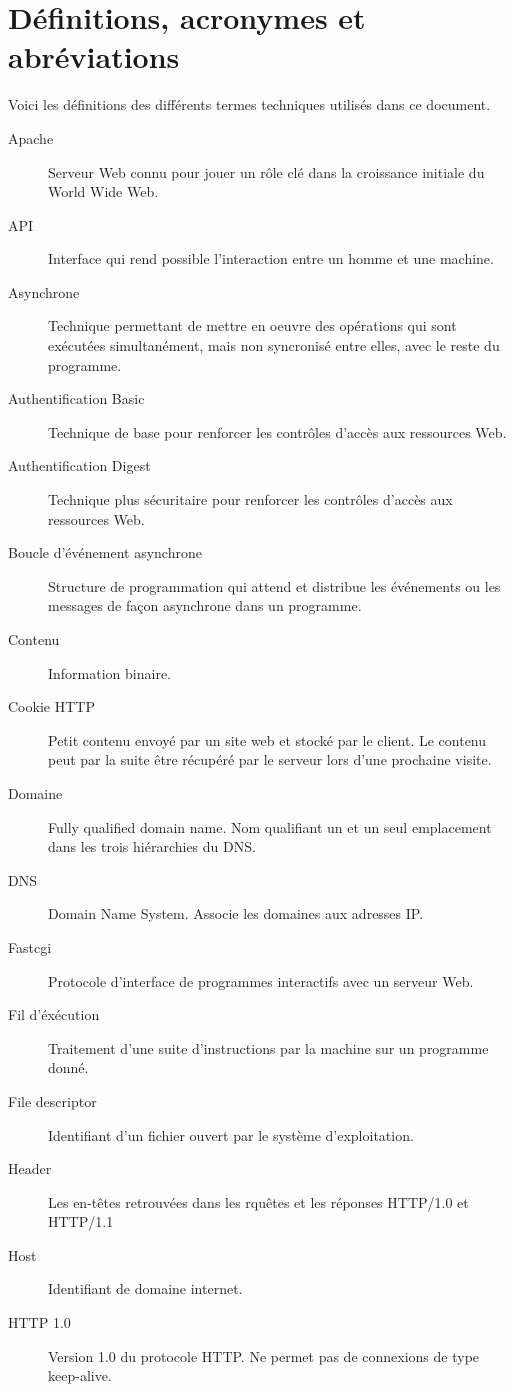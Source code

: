 \documentclass{scrreprt}
\begin{document}
\section{Définitions, acronymes et abréviations}
Voici les définitions des différents termes techniques utilisés dans ce
document.
\begin{description}
    \item[Apache] Serveur Web connu pour jouer un rôle clé dans la croissance initiale du World Wide Web.
	\item[API] Interface qui rend possible l'interaction entre un homme et une machine.
    \item[Asynchrone]Technique permettant de mettre en oeuvre des opérations qui sont exécutées simultanément, mais non syncronisé entre elles, avec le reste du programme. 
	\item[Authentification Basic]Technique de base pour renforcer les contrôles d'accès aux ressources Web.
    \item[Authentification Digest]Technique plus sécuritaire pour renforcer les contrôles d'accès aux ressources Web.
	\item[Boucle d'événement asynchrone] Structure de programmation qui attend et distribue les événements ou les messages de façon asynchrone dans un programme.
    \item[Contenu] Information binaire.
    \item[Cookie HTTP] Petit contenu envoyé par un site web et stocké par le client. Le contenu peut par la suite être récupéré par le serveur lors d'une prochaine visite.
    \item[Domaine] Fully qualified domain name. Nom qualifiant un et un seul emplacement dans les trois hiérarchies du DNS.
    \item[DNS] Domain Name System. Associe les domaines aux adresses IP.
    \item[Fastcgi] Protocole d'interface de programmes interactifs avec un serveur Web. 
    \item[Fil d'éxécution] Traitement d'une suite d'instructions par la machine sur un programme donné.
    \item[File descriptor] Identifiant d'un fichier ouvert par le système d'exploitation. 
 	\item[Header] Les en-têtes retrouvées dans les rquêtes et les réponses HTTP/1.0 et HTTP/1.1
    \item[Host] Identifiant de domaine internet.	
	\item[HTTP 1.0] Version 1.0 du protocole HTTP. Ne permet pas de connexions de type keep-alive.

\end{description}
\end{document}
